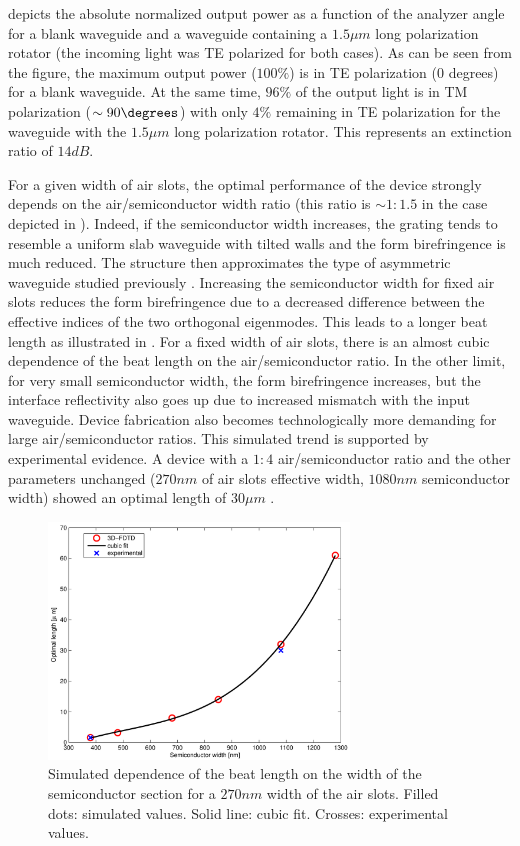  depicts the absolute normalized output
power as a function of the analyzer angle for a blank waveguide and a
waveguide containing a $1.5 \mu m$ long polarization rotator (the
incoming light was TE polarized for both cases). As can be seen from
the figure, the maximum output power ($100\%$) is in TE polarization
($0$ degrees) for a blank waveguide. At the same time, $96\%$ of the
output light is in TM polarization ($\sim 90\degrees$) with only $4\%$
remaining in TE polarization for the waveguide with the $1.5 \mu m$
long polarization rotator. This represents an extinction ratio of $14
dB$.

For a given width of air slots, the optimal performance of the device
strongly depends on the air/semiconductor width ratio (this ratio is
$\sim 1:1.5$ in the case depicted in
). Indeed, if the semiconductor width
increases, the grating tends to resemble a uniform slab waveguide with
tilted walls and the form birefringence is much reduced. The structure
then approximates the type of asymmetric waveguide studied previously
\cite{taillaert_compact}. Increasing the semiconductor width for fixed
air slots reduces the form birefringence due to a decreased difference
between the effective indices of the two orthogonal eigenmodes. This
leads to a longer beat length as illustrated in
. For a fixed width of air slots, there
is an almost cubic dependence of the beat length on the
air/semiconductor ratio. In the other limit, for very small
semiconductor width, the form birefringence increases, but the
interface reflectivity also goes up due to increased mismatch with the
input waveguide. Device fabrication also becomes technologically more
demanding for large air/semiconductor ratios. This simulated trend is
supported by experimental evidence. A device with a $1:4$
air/semiconductor ratio and the other parameters unchanged ($270 nm$
of air slots effective width, $1080 nm$ semiconductor width) showed an
optimal length of $30 \mu m$ .

\begin{figure}[htbp]
  \begin{center}
    \includegraphics[width=8cm]{pics/polrot_optimalL_P}
  \end{center}
  \caption{Simulated dependence of the beat length on the width of the
    semiconductor section for a $270 nm$ width of the air slots. Filled
    dots: simulated values. Solid line: cubic fit. Crosses: experimental
    values.}
  \label{fig:polrot_optimalL_P}
\end{figure}


